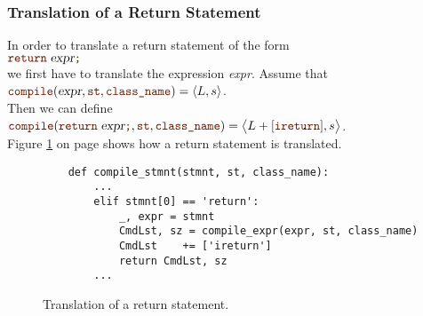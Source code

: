 \subsubsection{Translation of a Return Statement}
In order to translate a return statement of the form
\\[0.2cm]
\hspace*{1.3cm}
$\mytt{return}\; \textsl{expr} \mytt{;}$
\\[0.2cm]
we first have to translate the expression \textsl{expr}.  Assume that
\\[0.2cm]
\hspace*{1.3cm}
$\mytt{compile}(\textsl{expr}, \mytt{st}, \mytt{class\_name}) = \pair(L, s)$.
\\[0.2cm]
Then we can define
\\[0.2cm]\hspace*{1.3cm}
$\mytt{compile}(\mytt{return}\; \textsl{expr} \mytt{;}, \mytt{st}, \mytt{class\_name}) =
 \bigl\langle L + [\mytt{ireturn}], s \bigr\rangle$.
\\[0.2cm]
Figure \ref{fig:Compiler.ipynb:compile:return} on page \pageref{fig:Compiler.ipynb:compile:return} shows how a
return statement is translated.

\begin{figure}[!ht]
\centering
\begin{verbatim}
    def compile_stmnt(stmnt, st, class_name):
        ...
        elif stmnt[0] == 'return':
            _, expr = stmnt
            CmdLst, sz = compile_expr(expr, st, class_name)
            CmdLst    += ['ireturn']
            return CmdLst, sz
        ...       
\end{verbatim}
\vspace*{-0.3cm}
\caption{Translation of a return statement.}
\label{fig:Compiler.ipynb:compile:return}
\end{figure}

